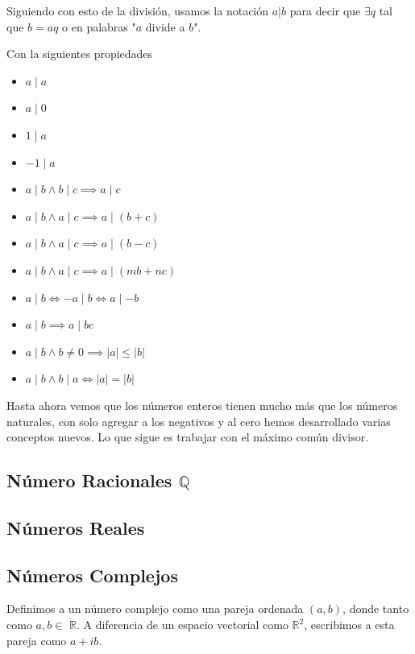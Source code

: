 \documentclass[11pt]{article}
\begin{document}
Siguiendo con esto de la división, usamos la notación $a|b$ para decir que $\exists q $ tal que $b=aq$ o en palabras "$a$ divide a $b$". 

Con la siguientes propiedades

\begin{itemize}
    \item $a\mid a$
    \item $a\mid 0$
    \item $1\mid a$
    \item $-1\mid a$
    \item $a\mid b \land b\mid c \implies a\mid c$
    \item $a\mid b \land a\mid c \implies a\mid(b+c)$
    \item $a\mid b \land a\mid c \implies a\mid(b-c)$
    \item $a\mid b \land a\mid c
    \implies a\mid(mb+nc)$
    \item $a\mid b \iff -a\mid b \iff a\mid -b$
    \item $a\mid b \implies a\mid bc$
    \item $a\mid b \land b\neq0 \implies |a|\leq |b|$
    \item $a\mid b \land b\mid a \iff |a|=|b|$
\end{itemize}

Hasta ahora vemos que los números enteros tienen mucho más que los números naturales, con solo agregar a los negativos y al cero hemos desarrollado varias conceptos nuevos. Lo que sigue es trabajar con el máximo común divisor.

\subsection{Número Racionales $\mathbb Q$}



\subsection{Números Reales}



\subsection{Números Complejos}

Definimos a un número complejo como una pareja ordenada $(a,b)$, donde tanto como $a,b\in$ $\mathbb{R}$. A diferencia de un espacio vectorial como $\mathbb{R}^2$, escribimos a esta pareja como $a+ib$.
\end{document}
